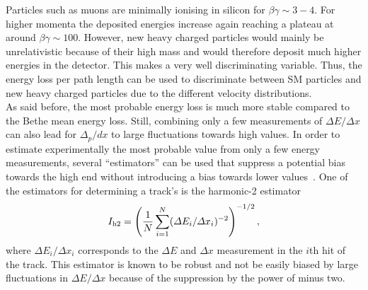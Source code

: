 Particles such as  muons are minimally ionising in silicon for $\beta\gamma \sim 3-4$. 
For higher momenta the deposited energies increase again reaching a plateau at around $\beta\gamma\sim100$. 
However, new heavy charged particles would mainly be unrelativistic because of their high mass and would therefore deposit much higher energies in the detector.
This makes \dedx  a very well discriminating variable.
Thus, the energy loss per path length can be used to discriminate between SM particles and new heavy charged particles due to the different velocity distributions.\\

As said before, the most probable energy loss is much more stable compared to the Bethe mean energy loss.
Still, combining only a few measurements of $\Delta E/\Delta x$ can also lead for $\Delta_p/dx$ to large fluctuations towards high \dedx values.
In order to estimate experimentally the most probable \dedx value from only a few energy measurements, several ``estimators'' can be used that suppress a potential bias towards the high end without introducing a bias towards lower values~\cite{bib:Quertenmont_2010}.
One of the estimators for determining a track's \dedx is the harmonic-2 estimator
\begin{equation}
I_{\text{h2}}=\left( \frac{1}{N}\sum_{i=1}^{N}(\Delta E_i/\Delta x_i)^{-2} \right)^{-1/2},
\label{eq:Harmonic2Estimator}
\end{equation}
where $\Delta E_i /\Delta x_i$ corresponds to the $\Delta E$ and $\Delta x$ measurement in the $i$th hit of the track. 
This estimator is known to be robust and not be easily biased by large fluctuations in  $\Delta E/\Delta x$ because of the suppression by the power of minus two.



